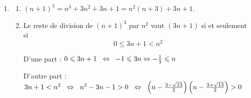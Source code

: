 \begin{enumerate}[label=\thechapter.\arabic*, font=\bfseries, itemsep=7mm,labelsep*=3mm,left=0mm]
\smallskip
Voici les couples de nombres entiers positifs dont le produit est 15 : 
$$(1; 15) \eh{5} (3 ; 5)$$
En remarquant que $x$ est forcément plus grand que $(x-2y)$, nous pouvons construire le tableau suivant qui résume toutes les possibilités :

\begin{center}
\begin{tabular}{|c||c||c|}
\hline
$x$		& $15$	& $5$\\ 
\hline
$x-2y$	& $1$	& $3$\\
\hline
\rowcolor{gray!40} $x(x-2y)$	& $15$	& $15$\\
\hline\hline
$x$		& $15$	& $5$\\
\hline
$y$		& $7$	& $1$\\
\hline
\end{tabular}
\end{center}
Les solutions sont donc $(15; 7)$ et $(5; 1)$. \,D'où : $S=\big\lbrace(5; 1) \; ; \; (15; 7)\big\rbrace$
	



%
%



\item
\begin{enumerate}[label=\roman*),itemsep=5mm]
\item $(n+1)^3=n^3+3n^2+3n+1=n^2(n+3)+3n+1$.
\item Le reste de division de $(n+1)^3$ par $n^2$ vaut $(3n+1)$ si et seulement si $$0\leqslant 3n+1<n^2$$


D'une part : $0\leqslant 3n+1 \ssi[2] -1\leqslant 3n \ssi -\frac{1}{3}\leqslant n$

\medskip
D'autre part : $3n+1<n^2 \ssi[2] n^2-3n-1>0 \ssi[2] \left(n-\frac{3-\sqrt{13}}{2}\right)\left(n-\frac{3+\sqrt{13}}{2}\right)>0 $


\end{enumerate}
\end{enumerate}
